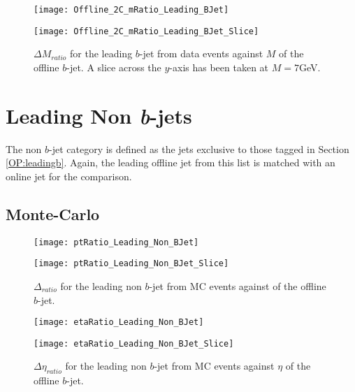 		\begin{figure}[h]
			\centering
			
			\begin{minipage}[h]{0.33\linewidth}
				\texttt{[image: Offline\_2C\_mRatio\_Leading\_BJet]}
			\end{minipage}
			\quad
			\begin{minipage}[h]{0.33\linewidth}
				\texttt{[image: Offline\_2C\_mRatio\_Leading\_BJet\_Slice]}
			\end{minipage}
			\caption{$\Delta M_{ratio}$ for the leading \pt $b$-jet from  data events against $M$ of the offline $b$-jet. A slice across the $y$-axis has been taken at $M=7$GeV. }
			\label{fig:D:leadingbm}
		\end{figure}

\newpage
\section{Leading Non \textit{b}-jets}

	The non $b$-jet category is defined as the jets exclusive to those tagged in Section \ref{OP:leadingb}. Again, the leading \pt offline jet from this list is matched with an online jet for the comparison.

	\subsection{Monte-Carlo}

		\begin{figure}[h]
			\centering
			\begin{minipage}[h]{0.33\linewidth}
				\texttt{[image: ptRatio\_Leading\_Non\_BJet]}

			\end{minipage}
			\quad
			\begin{minipage}[h]{0.33\linewidth}
				\texttt{[image: ptRatio\_Leading\_Non\_BJet\_Slice]}
			\end{minipage}
			\caption{$\Delta $\pt$_{ratio}$ for the leading \pt non $b$-jet from MC events against \pt of the offline $b$-jet. }
			\label{fig:MC:nonleadingbpt}
		\end{figure}

		\begin{figure}[h]
			\centering

			\begin{minipage}[h]{0.33\linewidth}
				\texttt{[image: etaRatio\_Leading\_Non\_BJet]}
			\end{minipage}
			\quad
			\begin{minipage}[h]{0.33\linewidth}
				\texttt{[image: etaRatio\_Leading\_Non\_BJet\_Slice]}
			\end{minipage}
			\caption{$\Delta \eta_{ratio}$ for the leading \pt non $b$-jet from MC events against $\eta$ of the offline $b$-jet. }
			\label{fig:MC:nonleadingbeta}
		\end{figure}

